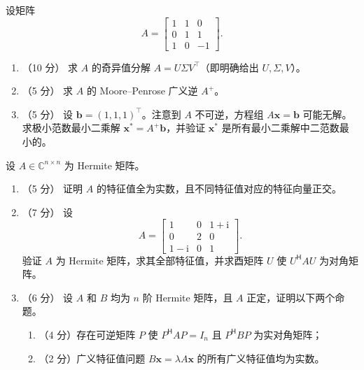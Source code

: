 \documentclass[11pt,a4paper]{exam-zh}
\newcommand{\bvec}[1]{\boldsymbol{#1}}
\newcommand{\ct}{\mathsf{H}}
\newcommand{\C}{\mathbb{C}}
\begin{document}
\begin{problem}[points = 20]
设矩阵
\[
A = \begin{bmatrix}
1 & 1 & 0 \\
0 & 1 & 1 \\
1 & 0 & -1
\end{bmatrix}.
\]

\begin{enumerate}
    \item （10 分） 求 $A$ 的奇异值分解 $A = U \Sigma V^\top$（即明确给出 $U, \Sigma, V$）。

    \item （5 分） 求 $A$ 的 Moore--Penrose 广义逆 $A^+$。

    \item （5 分） 设 $\bvec{b} = (1, 1, 1)^\top$。注意到 $A$ 不可逆，方程组 $A\bvec{x} = \bvec{b}$ 可能无解。求极小范数最小二乘解 $\bvec{x}^* = A^+ \bvec{b}$，并验证 $\bvec{x}^*$ 是所有最小二乘解中二范数最小的。
\end{enumerate}
\end{problem}


\begin{problem}[points = 18]
设 $A \in \C^{n \times n}$ 为 Hermite 矩阵。

\begin{enumerate}
    \item （5 分） 证明 $A$ 的特征值全为实数，且不同特征值对应的特征向量正交。

    \item （7 分） 设
    \[
    A = \begin{bmatrix}
    1      & 0      & 1 + \mathrm{i} \\
    0      & 2      & 0              \\
    1 - \mathrm{i} & 0      & 1
    \end{bmatrix}.
    \]
    验证 $A$ 为 Hermite 矩阵，求其全部特征值，并求酉矩阵 $U$ 使 $U^\ct A U$ 为对角矩阵。

    \item （6 分） 设 $A$ 和 $B$ 均为 $n$ 阶 Hermite 矩阵，且 $A$ 正定，证明以下两个命题。
    \begin{enumerate}
        \item （4 分）存在可逆矩阵 $P$ 使 $P^\ct A P = I_n$ 且 $P^\ct B P$ 为实对角矩阵；
        \item （2 分）广义特征值问题 $B\bvec{x} = \lambda A \bvec{x}$ 的所有广义特征值均为实数。
    \end{enumerate}
\end{enumerate}
\end{problem}
\end{document}
